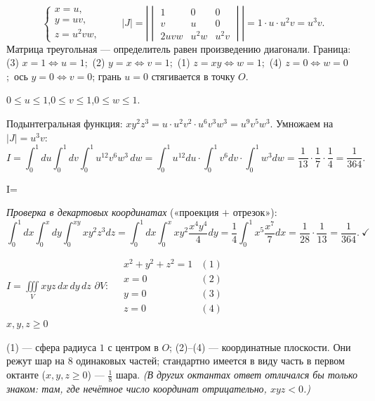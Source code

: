 \[
\begin{cases}x=u,\\ y=uv,\\ z=u^2vw,\end{cases}
\qquad
|J|=\left|\begin{vmatrix}1&0&0\\ v&u&0\\ 2uvw&u^2w&u^2v\end{vmatrix}\right|=1\cdot u\cdot u^2v=u^3v .
\]
Матрица треугольная --- определитель равен произведению диагонали. Граница: (3) $x=1\iff u=1$;\ (2) $y=x\iff v=1$;\ (1) $z=xy\iff w=1$;\ (4) $z=0\iff w=0$;\ ось $y=0\iff v=0$; грань $u=0$ стягивается в точку $O$.

$0\leqslant u\leqslant1$,\quad $0\leqslant v\leqslant1$,\quad $0\leqslant w\leqslant1$.

Подынтегральная функция: $xy^2z^3=u\cdot u^2v^2\cdot u^6v^3w^3=u^9v^5w^3$. Умножаем на $|J|=u^3v$:
\[
I=\int_0^1du\int_0^1dv\int_0^1u^{12}v^6w^3\,dw=\int_0^1u^{12}du\cdot\int_0^1v^6dv\cdot\int_0^1w^3dw=\frac1{13}\cdot\frac17\cdot\frac14=\frac1{364}.
\]

\begin{answerbox}
I=
\end{answerbox}

\emph{Проверка в декартовых координатах} («проекция $+$ отрезок»):
\[
\int_0^1dx\int_0^xdy\int_0^{xy}xy^2z^3dz=\int_0^1dx\int_0^x xy^2\frac{x^4y^4}{4}dy=\frac14\int_0^1x^5\frac{x^7}{7}dx=\frac1{28}\cdot\frac1{13}=\frac1{364}.\ \checkmark
\]


\begin{shapka}
$\displaystyle I=\iiint\limits_{V}xyz\,dx\,dy\,dz$
\tcblower
$\partial V:\quad
\begin{array}{ll}
x^2+y^2+z^2=1 & (1)\\
x=0 & (2)\\
y=0 & (3)\\
z=0 & (4)
\end{array}$\\[1mm] $x,y,z\geqslant0$
\end{shapka}

(1) --- сфера радиуса $1$ с центром в $O$; (2)--(4) --- координатные плоскости. Они режут шар на 8 одинаковых частей; стандартно имеется в виду часть в первом октанте ($x,y,z\geqslant0$) --- $\frac18$ шара.
\emph{(В других октантах ответ отличался бы только знаком: там, где нечётное число координат отрицательно, $xyz<0$.)}

